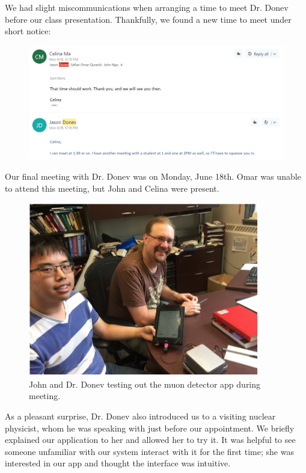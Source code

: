 \documentclass[11pt,a4paper]{article}
\begin{document}
We had slight miscommunications when arranging a time to meet Dr. Donev before our class presentation. Thankfully, we found a new time to meet under short notice: 

\begin{figure}[h] \centering
	\includegraphics[width=1.08\textwidth]{email3.png}
\end{figure}

Our final meeting with Dr. Donev was on Monday, June 18th. Omar was unable to attend this meeting, but John and Celina were present.


\begin{figure}[h] \centering
	\includegraphics[width=0.9\textwidth]{client1.png}
	\caption{John and Dr. Donev testing out the muon detector app during meeting.}
\end{figure}

As a pleasant surprise, Dr. Donev also introduced us to a visiting nuclear physicist, whom he was speaking with just before our appointment. We briefly explained our application to her and allowed her to try it. It was helpful to see someone unfamiliar with our system interact with it for the first time; she was interested in our app and thought the interface was intuitive.
\end{document}
